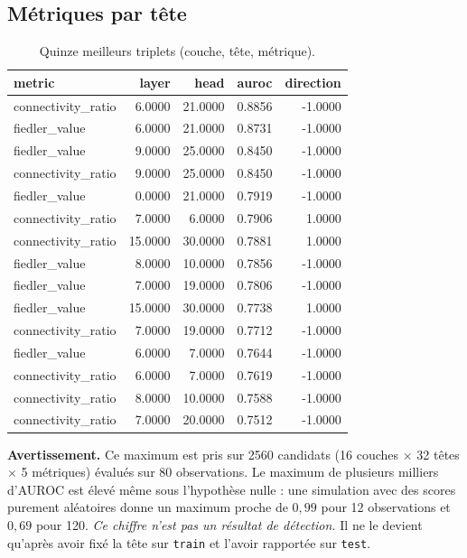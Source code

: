 \documentclass[11pt,a4paper]{article}
\begin{document}
\subsection{Métriques par tête}

\begin{table}[htbp]
\centering
\small
\begin{tabular}{lrrrr}
\hline
metric & layer & head & auroc & direction \\
\hline
connectivity\_ratio & 6.0000 & 21.0000 & 0.8856 & -1.0000 \\
fiedler\_value & 6.0000 & 21.0000 & 0.8731 & -1.0000 \\
fiedler\_value & 9.0000 & 25.0000 & 0.8450 & -1.0000 \\
connectivity\_ratio & 9.0000 & 25.0000 & 0.8450 & -1.0000 \\
fiedler\_value & 0.0000 & 21.0000 & 0.7919 & -1.0000 \\
connectivity\_ratio & 7.0000 & 6.0000 & 0.7906 & 1.0000 \\
connectivity\_ratio & 15.0000 & 30.0000 & 0.7881 & 1.0000 \\
fiedler\_value & 8.0000 & 10.0000 & 0.7856 & -1.0000 \\
fiedler\_value & 7.0000 & 19.0000 & 0.7806 & -1.0000 \\
fiedler\_value & 15.0000 & 30.0000 & 0.7738 & 1.0000 \\
connectivity\_ratio & 7.0000 & 19.0000 & 0.7712 & -1.0000 \\
fiedler\_value & 6.0000 & 7.0000 & 0.7644 & -1.0000 \\
connectivity\_ratio & 6.0000 & 7.0000 & 0.7619 & -1.0000 \\
connectivity\_ratio & 8.0000 & 10.0000 & 0.7588 & -1.0000 \\
connectivity\_ratio & 7.0000 & 20.0000 & 0.7512 & -1.0000 \\
\hline
\end{tabular}
\caption{Quinze meilleurs triplets (couche, tête, métrique).}
\label{tab:heads}
\end{table}


\textbf{Avertissement.} Ce maximum est pris sur 2560 candidats
(16 couches $\times$ 32 têtes
$\times$ 5 métriques) évalués sur 80
observations. Le maximum de plusieurs milliers d'AUROC est élevé même sous
l'hypothèse nulle : une simulation avec des scores purement aléatoires donne
un maximum proche de $0{,}99$ pour 12 observations et $0{,}69$ pour 120.
\emph{Ce chiffre n'est pas un résultat de détection.} Il ne le devient
qu'après avoir fixé la tête sur \texttt{train} et l'avoir rapportée sur
\texttt{test}.
\end{document}
